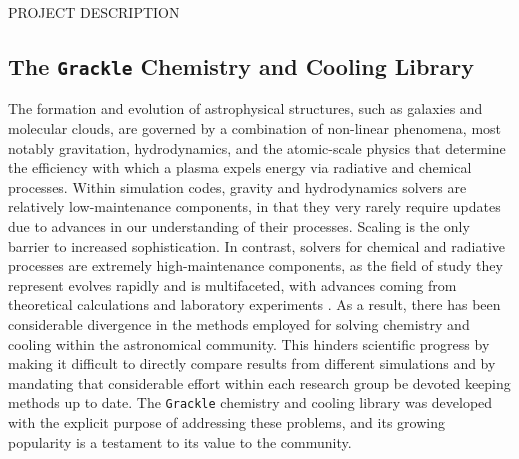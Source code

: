 \documentclass[11pt]{article}
\newcommand{\grackle}{\texttt{Grackle}}
\begin{document}
\clearpage

\clearpage
\begin{center} 
{\large PROJECT DESCRIPTION}\\
\end{center}
\begin{flushleft}
\section{The \grackle{} Chemistry and Cooling Library}

The formation and evolution of astrophysical structures, such as
galaxies and molecular clouds, are governed
by a combination of non-linear phenomena, most notably gravitation,
hydrodynamics, and the atomic-scale physics that determine the
efficiency with which a plasma expels energy via radiative and
chemical processes.  Within simulation codes, gravity and
hydrodynamics solvers are relatively low-maintenance components, in
that they very rarely require updates due to advances in our
understanding of their processes.  Scaling is the only barrier to
increased sophistication.
In contrast, solvers for chemical and radiative processes are
extremely high-maintenance components, as the field of study they
represent evolves rapidly and is multifaceted, with advances coming
from theoretical calculations \citep[e.g.,][]{2007MNRAS.377..705F,
  2007MNRAS.382..133W, 2008MNRAS.388.1627G, 2008ApJ...689.1105L,
  2012JChPh.137o4303L, 2014ApJ...790...10S, 2015MNRAS.453..810L,
  2016MNRAS.457.3732C, 2017MNRAS.466.2175C} and laboratory experiments
\citep[e.g.,][]{2010Sci...329...69K, 2010PhRvA..82d2708B,
  2011PhRvA..84e2709M, 2015JPhCS.635b2092R, 2015ApJS..219....6O,
  2016ApJ...816...31D, 2016ApJ...832...31V}.  As a result, there
has been considerable divergence in the methods employed for solving chemistry
and cooling within the astronomical community.  This hinders scientific
progress by making it difficult to directly compare results from
different simulations and by mandating that considerable effort
within each research group be devoted keeping methods up to date.  The
\grackle{} chemistry and cooling library was developed with the
explicit purpose of addressing these problems, and its growing popularity
is a testament to its value to the community.


\end{flushleft}
\end{document}
